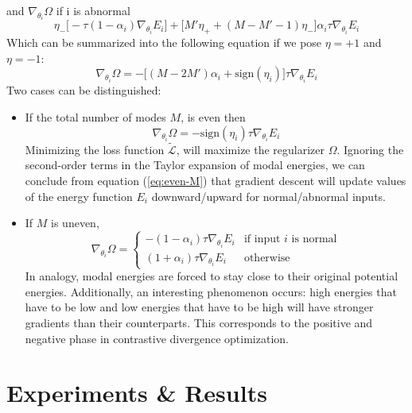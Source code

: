 \documentclass[12pt]{report}
\begin{document}
and $\nabla_{\theta_i}\Omega$ if i is abnormal 
\begin{equation}
\eta_-\big[ -\tau(1-\alpha_i)\nabla_{\theta_i}E_i \big] + \big[M'\eta_+ + (M-M'-1)\eta_-\big]\alpha_i\tau\nabla_{\theta_i}E_i
\label{eq:abnormal-exp}
\end{equation}
Which can be summarized into the following equation if we pose $\eta=+1$ and $\eta=-1$:
\begin{equation}
\boxed{\nabla_{\theta_i}\Omega = -\big[(M-2M')\alpha_i + \text{sign}(\eta_i)\big]\tau\nabla_{\theta_i}E_i}
\end{equation}
Two cases can be distinguished:
\begin{itemize}
\item If the total number of modes $M$, is even then
\begin{equation}
\nabla_{\theta_i}\Omega = -\text{sign}(\eta_i)\tau\nabla_{\theta_i}E_i
\label{eq:even-M}
\end{equation}
Minimizing the loss function $\tilde{\mathcal{L}}$, will maximize the regularizer $\Omega$. Ignoring the second-order terms in the Taylor expansion of modal energies, we can conclude from equation (\ref{eq:even-M}) that gradient descent will update values of the energy function $E_i$ downward/upward for normal/abnormal inputs. 

\item If $M$ is uneven,
\begin{equation}
\nabla_{\theta_i}\Omega = \begin{cases}
      -(1-\alpha_i)\tau\nabla_{\theta_i}E_i & \text{if input $i$ is normal}  \\
      (1+\alpha_i)\tau\nabla_{\theta_i}E_i & \text{otherwise}
    \end{cases}
\label{eq:uneven-M}
\end{equation}
In analogy, modal energies are forced to stay close to their original potential energies. Additionally, an interesting phenomenon occurs: high energies that have to be low and low energies that have to be high will have stronger gradients than their counterparts. This corresponds to the positive and negative phase in contrastive divergence optimization.
\end{itemize}
\newpage
\section{Experiments \& Results}\label{sec:experim}
\end{document}
